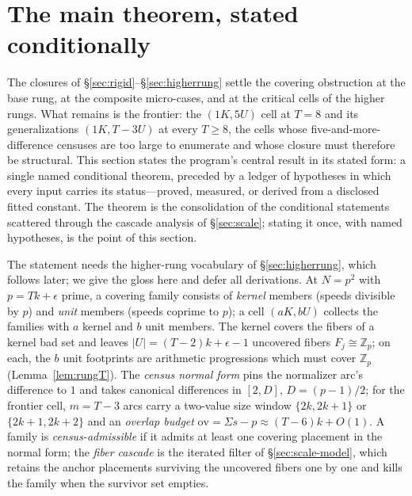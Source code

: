 \documentclass[11pt,a4paper]{article}
\numberwithin{equation}{section}
\theoremstyle{plain}
\theoremstyle{definition}
\theoremstyle{remark}
\newcommand{\Z}{\mathbb{Z}}
\begin{document}
\section{The main theorem, stated conditionally}\label{sec:SC}

The closures of \S\ref{sec:rigid}--\S\ref{sec:higherrung} settle the
covering obstruction at the base rung, at the composite micro-cases, and
at the critical cells of the higher rungs. What remains is the frontier:
the $(1K,5U)$ cell at $T=8$ and its generalizations $(1K,T{-}3U)$ at
every $T\ge 8$, the cells whose five-and-more-difference censuses are too
large to enumerate and whose closure must therefore be structural. This
section states the program's central result in its stated form:
a single named conditional theorem, preceded by a ledger of
hypotheses in which every input carries its status---proved, measured,
or derived from a disclosed fitted constant. The theorem is the
consolidation of the conditional statements scattered through the
cascade analysis of \S\ref{sec:scale}; stating it once, with named
hypotheses, is the point of this section.

The statement needs the higher-rung vocabulary of
\S\ref{sec:higherrung}, which follows later; we give the gloss here and
defer all derivations. At $N=p^2$ with $p=Tk+\epsilon$ prime, a covering
family consists of \emph{kernel} members (speeds divisible by $p$) and
\emph{unit} members (speeds coprime to $p$); a cell $(aK,bU)$ collects
the families with $a$ kernel and $b$ unit members. The kernel covers the
fibers of a kernel bad set and leaves $|U|=(T-2)k+\epsilon-1$ uncovered
fibers $F_j\cong\Z_p$; on each, the $b$ unit footprints are arithmetic
progressions which must cover $\Z_p$ (Lemma~\ref{lem:rungT}). The
\emph{census normal form} pins the normalizer arc's difference to $1$
and takes canonical differences in $[2,D]$, $D=(p-1)/2$; for the
frontier cell, $m=T-3$ arcs carry a two-value size window
$\{2k,2k+1\}$ or $\{2k+1,2k+2\}$ and an \emph{overlap budget}
$\mathrm{ov}=\Sigma s-p\approx(T-6)k+O(1)$. A family is
\emph{census-admissible} if it admits at least one covering placement in
the normal form; the \emph{fiber cascade} is the iterated filter of
\S\ref{sec:scale-model}, which retains the anchor placements surviving
the uncovered fibers one by one and kills the family when the survivor
set empties.
\end{document}
